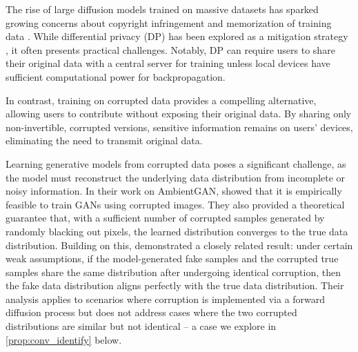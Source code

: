 The rise of large diffusion models trained on massive datasets has sparked growing concerns about copyright infringement and memorization of training data \citep{CarliniHNJSTBIDW2023, SomepalliSGGG2023}. While differential privacy (DP) has been explored as a mitigation strategy \citep{AbadiCGMMTZ2016, XieLWWR2018, DockhornCVK2023}, it often presents practical challenges. Notably, DP can require users to share their original data with a central server for training unless local devices have sufficient computational power for backpropagation.


In contrast, training on corrupted data provides a compelling alternative, allowing users to contribute without exposing their original data. By sharing only non-invertible, corrupted versions, sensitive information remains on users’ devices, eliminating the need to transmit original data.

Learning generative models from corrupted data poses a significant challenge, as the model must reconstruct the underlying data distribution from incomplete or noisy information. In their work on AmbientGAN, \citet{BoraPD2018} showed that it is empirically feasible to train GANs using corrupted images. They also provided a theoretical guarantee that, with a sufficient number of corrupted samples generated by randomly blacking out pixels, the learned distribution converges to the true data distribution. Building on this, \citet{WangZHCZ2023} demonstrated a closely related result: under certain weak assumptions, if the model-generated fake samples and the corrupted true samples share the same distribution after undergoing identical corruption, then the fake data distribution aligns perfectly with the true data distribution. Their analysis applies to scenarios where corruption is implemented via a forward diffusion process but does not address cases where the two corrupted distributions are similar but not identical -- a case we explore in \cref{prop:conv_identify} below.


